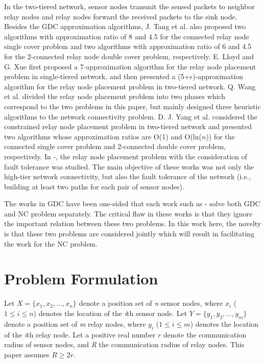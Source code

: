\documentclass[journal]{IEEEtran}
\begin{document}
In the two-tiered network, sensor nodes transmit the sensed packets to neighbor relay nodes and relay nodes forward the received packets to the sink node. Besides the GDC approximation algorithms, J. Tang et al. \cite{Tang06} also proposed two algorithms with approximation ratio of 8 and 4.5 for the connected relay node single cover problem and two algorithms with approximation ratio of 6 and 4.5 for the 2-connected relay node double cover problem, respectively.
E. Lloyd and G. Xue \cite{Lloyd07} first proposed a 7-approximation algorithm for the relay node placement problem in single-tiered network, and then presented a (5+$\epsilon$)-approximation algorithm for the relay node placement problem in two-tiered network. Q. Wang et al. \cite{Wang07} divided the relay node placement problem into two phases which correspond to the two problems in this paper, but mainly designed three heuristic algorithms to the network connectivity problem. D. J. Yang et al. \cite{Yang12} considered the constrained relay node placement problem in two-tiered network and presented two algorithms whose approximation ratios are O(1) and O(ln($n$)) for the connected single cover problem and 2-connected double cover problem, respectively. In \cite{Sandor08}-\cite{Dandekar12}, the relay node placement problem with the consideration of fault tolerance was studied. The main objective of these works was not only the high-tier network connectivity, but also the fault tolerance of the network (i.e., building at least two paths for each pair of sensor nodes).

The works in GDC have been one-sided that each work such as \cite{Tang06} \cite{Lin99}-\cite{Dandekar12} solve both GDC and NC problem separately. The critical flaw in these works is that they ignore the important relation between these two problems. In this work here, the novelty is that these two problems are considered jointly which will result in facilitating the work for the NC problem.

\section{Problem Formulation}
Let $X=\{x_1, x_2,\ldots, x_n\}$  denote a position set of \emph{n} sensor nodes, where $x_i$ ($1\leq i\leq n$) denotes the location of the \emph{i}th sensor node. Let $Y=\{y_1, y_2, \ldots, y_m\}$ denote a position set of \emph{m} relay nodes, where $y_i$ ($1\leq i\leq m$) denotes the location of the \emph{i}th relay node. Let a positive real number $r$ denote the communication radius of sensor nodes, and \emph{R} the communication radius of relay nodes. This paper assumes $R\geq 2r$.
\end{document}
